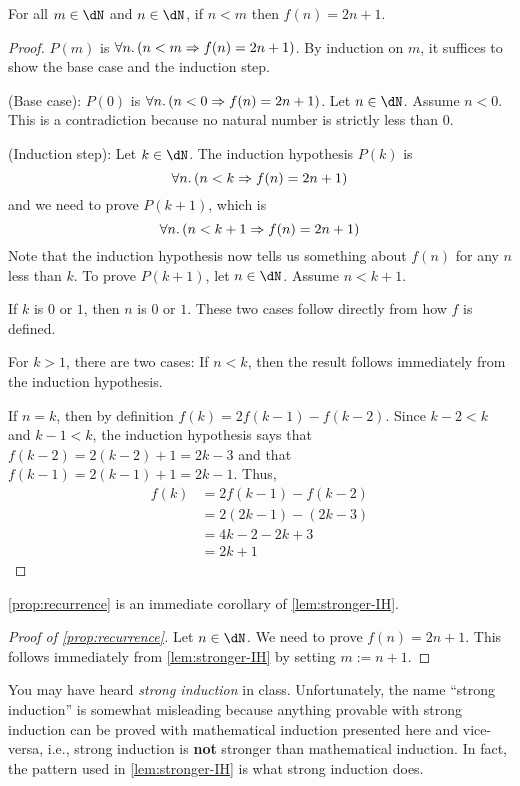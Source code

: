 \documentclass{amsart}
\begin{document}
\begin{lem}\label{lem:stronger-IH}
  For all $m \in \dN$ and $n \in \dN$, if $n < m$ then $f(n) = 2n + 1$.
\end{lem}
\begin{proof}
  $P(m)$ is $\forall n.\,(n < m \Rightarrow f(n) = 2n + 1)$.
  By induction on $m$, it suffices to show the base case and the induction step.

  (Base case): $P(0)$ is $\forall n.\,(n < 0 \Rightarrow f(n) = 2n + 1)$.
  Let $n \in \dN$.
  Assume $n < 0$.
  This is a contradiction because no natural number is strictly less than $0$.

  (Induction step): Let $k \in \dN$.
  The induction hypothesis $P(k)$ is
  \[
    \forall n.\,(n < k \Rightarrow f(n) = 2n + 1)
  \]
  and we need to prove $P(k+1)$, which is
  \[
    \forall n.\,(n < k + 1 \Rightarrow f(n) = 2n + 1)
  \]
  Note that the induction hypothesis now tells us something about $f(n)$ for any $n$ less than $k$.
  To prove $P(k+1)$, let $n \in \dN$.
  Assume $n < k + 1$.
  
  If $k$ is $0$ or $1$, then $n$ is $0$ or $1$.
  These two cases follow directly from how $f$ is defined.

  For $k > 1$, there are two cases:
  If $n < k$, then the result follows immediately from the induction hypothesis.
  
  If $n = k$, then by definition $f(k) = 2f(k-1) - f(k-2)$.
  Since $k - 2 < k$ and $k - 1 < k$, the induction hypothesis says that $f(k-2) = 2(k-2) + 1 = 2k - 3$ and that $f(k-1) = 2(k-1) + 1 = 2k - 1$.
  Thus,
  \begin{align}
    f(k) &= 2f(k-1) - f(k-2)\\
         &= 2(2k - 1) - (2k - 3)\\
         &= 4k - 2 - 2k + 3\\
         &= 2k + 1
  \end{align}
\end{proof}

\cref{prop:recurrence} is an immediate corollary of \cref{lem:stronger-IH}.
\begin{proof}[Proof of \cref{prop:recurrence}]
  Let $n \in \dN$.
  We need to prove $f(n) = 2n + 1$.
  This follows immediately from \cref{lem:stronger-IH} by setting $m := n + 1$.
\end{proof}

You may have heard \emph{strong induction} in class.
Unfortunately, the name ``strong induction'' is somewhat misleading because anything provable with strong induction can be proved with mathematical induction presented here and vice-versa, i.e., strong induction is \textbf{not} stronger than mathematical induction.
In fact, the pattern used in \cref{lem:stronger-IH} is what strong induction does.
\end{document}
